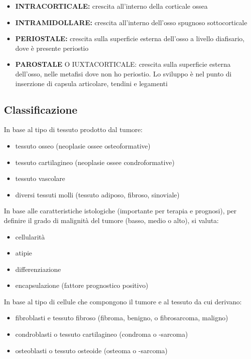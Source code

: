 \begin{itemize}
\item
  \textbf{INTRACORTICALE:} crescita all'interno della corticale ossea
\item
  \textbf{INTRAMIDOLLARE:} crescita all'interno dell'osso spugnoso sottocorticale
\item
  \textbf{PERIOSTALE:} crescita sulla superficie esterna dell'osso a livello diafisario, dove è presente periostio
\item
  \textbf{PAROSTALE} O IUXTACORTICALE: crescita sulla superficie esterna dell'osso, nelle metafisi dove non ho periostio. Lo sviluppo è nel punto di inserzione di capsula articolare, tendini e legamenti
\end{itemize}

\subsection{Classificazione}

In base al tipo di tessuto prodotto dal tumore:

\begin{itemize}
\item tessuto osseo (neoplasie ossee osteoformative)
\item tessuto cartilagineo (neoplasie ossee condroformative)
\item tessuto vascolare
\item diversi tessuti molli (tessuto adiposo, fibroso, sinoviale)
\end{itemize}

In base alle caratteristiche istologiche (importante per terapia e prognosi), per definire il grado di malignità del tumore (basso, medio o alto), si valuta:

\begin{itemize}
\item cellularità
\item atipie
\item differenziazione
\item encapsulazione (fattore prognostico positivo)
\end{itemize}

In base al tipo di cellule che compongono il tumore e al tessuto da cui derivano:

\begin{itemize}
\item fibroblasti e tessuto fibroso (fibroma, benigno, o fibrosarcoma, maligno)
\item condroblasti o tessuto cartilagineo (condroma o -sarcoma)
\item osteoblasti o tessuto osteoide (osteoma o -sarcoma)
\end{itemize}

